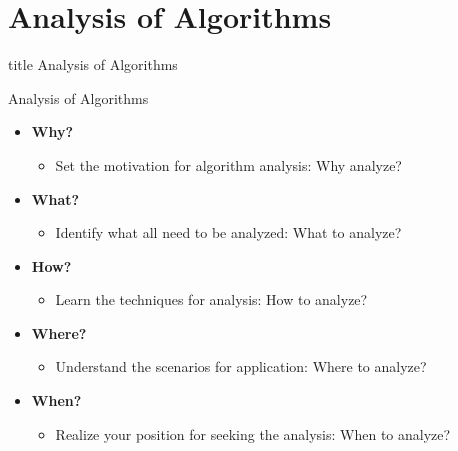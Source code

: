 \documentclass[aspectratio=169, xcolor=dvipsnames]{beamer}
\begin{document}
\section{Analysis of Algorithms}
\begin{frame}
  \vfill
  \centering
  \begin{beamercolorbox}[sep=8pt,center,shadow=true,rounded=true]{title}
    Analysis of Algorithms\par%
  \end{beamercolorbox}
  \vfill
\end{frame}

\begin{frame}{Analysis of Algorithms}
    \begin{block}{}
        \begin{itemize}[<+->]
            \item \textbf{Why?} 
            \begin{itemize}[<+->]
                \item Set the motivation for algorithm analysis: Why analyze?
            \end{itemize}
            \item \textbf{What?} 
            \begin{itemize}[<+->]
                \item Identify what all need to be analyzed: What to analyze?
            \end{itemize}
            \item \textbf{How?} 
            \begin{itemize}[<+->]
                \item Learn the techniques for analysis: How to analyze?
            \end{itemize}
            \item \textbf{Where?} 
            \begin{itemize}[<+->]
                \item Understand the scenarios for application: Where to analyze?
            \end{itemize}
            \item \textbf{When?} 
            \begin{itemize}[<+->]
                \item Realize your position for seeking the analysis: When to analyze?
            \end{itemize}
        \end{itemize}
    \end{block}
\end{frame}
\end{document}
